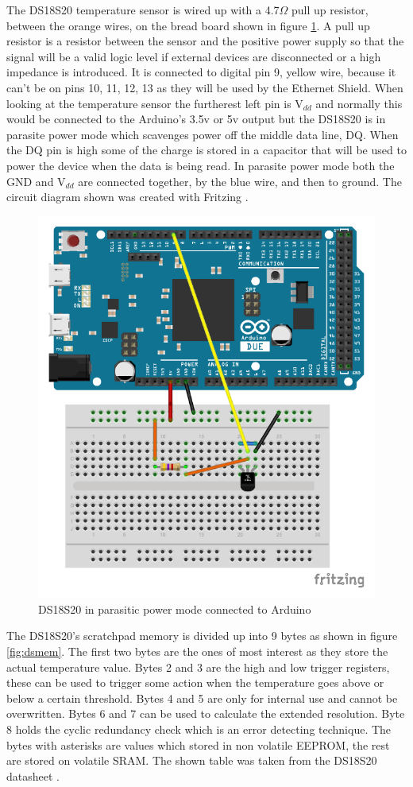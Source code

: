 The DS18S20 temperature sensor is wired up with a 4.7$\Omega$ pull up resistor, between the orange wires, on the bread board shown in figure \ref{fig:tempcircuit}. A pull up resistor is a resistor between the sensor and the positive power supply so that the signal will be a valid logic level if external devices are disconnected or a high impedance is introduced. It is connected to digital pin 9, yellow wire, because it can't be on pins 10, 11, 12, 13 as they will be used by the Ethernet Shield. When looking at the temperature sensor the furtherest left pin is V$_{dd}$ and normally this would be connected to the Arduino's 3.5v or 5v output but the DS18S20 is in parasite power mode which scavenges power off the middle data line, DQ. When the DQ pin is high some of the charge is stored in a capacitor that will be used to power the device when the data is being read. In parasite power mode both the GND and V$_{dd}$ are connected together, by the blue wire, and then to ground. The circuit diagram shown was created with Fritzing \cite{fritz}.

\begin{figure}[H]
	\centering
	\includegraphics[width=.5\linewidth]{Figures/TempSensor_bb.pdf}
	\caption{DS18S20 in parasitic power mode connected to Arduino}
	\label{fig:tempcircuit}
\end{figure}

The DS18S20's scratchpad memory is divided up into 9 bytes as shown in figure \ref{fig:dsmem}. The first two bytes are the ones of most interest as they store the actual temperature value. Bytes 2 and 3 are the high and low trigger registers, these can be used to trigger some action when the temperature goes above or below a certain threshold. Bytes 4 and 5 are only for internal use and cannot be overwritten. Bytes 6 and 7 can be used to calculate the extended resolution. Byte 8 holds the cyclic redundancy check which is an error detecting technique. The bytes with asterisks are values which stored in non volatile EEPROM, the rest are stored on volatile SRAM. The shown table was taken from the DS18S20 datasheet \cite{dsdatasheet}.

